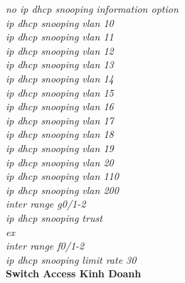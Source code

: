 \documentclass[a4paper, 12pt]{article}
\begin{document}
\hspace*{2cm}\textit{no ip dhcp snooping information option\\
\hspace*{2cm}ip dhcp snooping vlan 10\\
\hspace*{2cm}ip dhcp snooping vlan 11\\
\hspace*{2cm}ip dhcp snooping vlan 12\\
\hspace*{2cm}ip dhcp snooping vlan 13\\
\hspace*{2cm}ip dhcp snooping vlan 14\\
\hspace*{2cm}ip dhcp snooping vlan 15\\
\hspace*{2cm}ip dhcp snooping vlan 16\\
\hspace*{2cm}ip dhcp snooping vlan 17\\
\hspace*{2cm}ip dhcp snooping vlan 18\\
\hspace*{2cm}ip dhcp snooping vlan 19\\
\hspace*{2cm}ip dhcp snooping vlan 20\\
\hspace*{2cm}ip dhcp snooping vlan 110\\
\hspace*{2cm}ip dhcp snooping vlan 200\\
\hspace*{2cm}inter range g0/1-2\\
\hspace*{2cm}ip dhcp snooping trust\\
\hspace*{2cm}ex\\
\hspace*{2cm}inter range f0/1-2\\
\hspace*{2cm}ip dhcp snooping limit rate 30\\}
\hspace*{1cm}\textbf{Switch Access Kinh Doanh}\\
\end{document}

